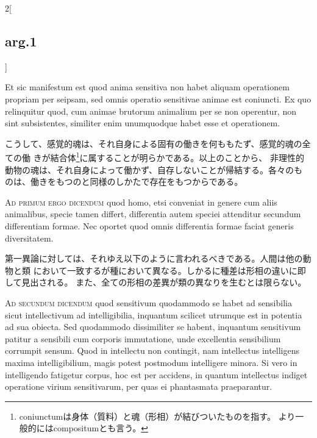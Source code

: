 \documentclass[paper=a4paper,fontsize=10pt,jafontsize=9pt,titlepage]{jlreq}
\begin{document}
\begin{paracol}{2}[\subsection{arg.1}]
\switchcolumn*

 Et sic manifestum est quod anima sensitiva non habet aliquam operationem
 propriam per seipsam, sed omnis operatio sensitivae animae est coniuncti. Ex
 quo relinquitur quod, cum animae brutorum animalium per se non operentur, non
 sint subsistentes, similiter enim unumquodque habet esse et operationem.

\switchcolumn

 こうして、感覚的魂は、それ自身による固有の働きを何ももたず、感覚的魂の全ての働
 きが結合体\footnote{coniunctumは身体（質料）と魂（形相）が結びついたものを指す。
 より一般的にはcompositumとも言う。}に属することが明らかである。以上のことから、
 非理性的動物の魂は、それ自身によって働かず、自存しないことが帰結する。各々のも
 のは、働きをもつのと同様のしかたで存在をもつからである。

\switchcolumn*[\subsection{ad 1}]

 {\scshape Ad primum ergo dicendum} quod homo, etsi conveniat in genere cum
 aliis animalibus, specie tamen differt, differentia autem speciei attenditur
 secundum differentiam formae. Nec oportet quod omnis differentia formae faciat
 generis diversitatem.

\switchcolumn

 第一異論に対しては、それゆえ以下のように言われるべきである。人間は他の動物と類
 において一致するが種において異なる。しかるに種差は形相の違いに即して見出される。
 また、全ての形相の差異が類の異なりを生むとは限らない。

\switchcolumn*[\subsection{ad 2}]

 {\scshape Ad secundum dicendum} quod sensitivum quodammodo se habet ad
 sensibilia sicut intellectivum ad intelligibilia, inquantum scilicet utrumque
 est in potentia ad sua obiecta. Sed quodammodo dissimiliter se habent,
 inquantum sensitivum patitur a sensibili cum corporis immutatione, unde
 excellentia sensibilium corrumpit sensum. Quod in intellectu non contingit, nam
 intellectus intelligens maxima intelligibilium, magis potest postmodum
 intelligere minora. Si vero in intelligendo fatigetur corpus, hoc est per
 accidens, in quantum intellectus indiget operatione virium sensitivarum, per
 quas ei phantasmata praeparantur.


\end{paracol}
\end{document}
